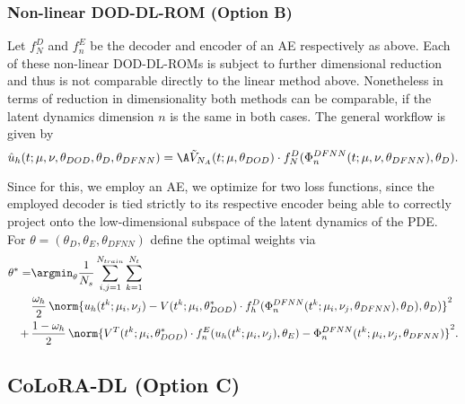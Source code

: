 \subsubsection{Non-linear DOD-DL-ROM (Option B)}

Let $f_N^D$ and $f_n^E$ be the decoder and encoder of an AE respectively as above. Each of these non-linear DOD-DL-ROMs is subject to further dimensional reduction and thus is not comparable directly to the linear method above. Nonetheless in terms of reduction in dimensionality both methods can be comparable, if the latent dynamics dimension $n$ is the same in both cases. The general workflow is given by
\begin{equation}
    \hat{u}_h(t; \mu, \nu, \theta_{DOD}, \theta_D, \theta_{DFNN}) = \A \Tilde{V}_{N_A}(t; \mu, \theta_{DOD}) \cdot f_N^D(\Phi_n^{DFNN}(t; \mu, \nu, \theta_{DFNN}), \theta_{D}).
\end{equation}

Since for this, we employ an AE, we optimize for two loss functions, since the employed decoder is tied strictly to its respective encoder being able to correctly project onto the low-dimensional subspace of the latent dynamics of the PDE. For $\theta = (\theta_D, \theta_E, \theta_{DFNN})$ define the optimal weights via
\begin{align*}
    \theta^* = &\argmin_\theta \frac{1}{N_s} \sum_{i, j = 1}^{N_{train}} \sum_{k = 1}^{N_t} \\
    &\frac{\omega_h}{2} \, \norm{u_h(t^k; \mu_i, \nu_j) - V(t^k; \mu_i, \theta_{DOD}^*) \cdot f^D_h(\Phi_n^{DFNN}(t^k; \mu_i, \nu_j, \theta_{DFNN}), \theta_D), \theta_{D})}^2 \\
    + \, &\frac{1 - \omega_h}{2} \, \norm{V^T(t^k; \mu_i, \theta_{DOD}^*) \cdot f^E_n(u_h(t^k; \mu_i, \nu_j), \theta_E) - \Phi_n^{DFNN}(t^k; \mu_i, \nu_j, \theta_{DFNN})}^2.
\end{align*}

\subsection{CoLoRA-DL (Option C)}


